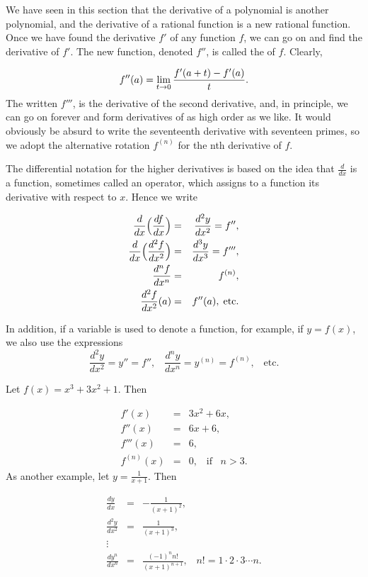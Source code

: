 We have seen in this section that the derivative of a polynomial is another polynomial, and the derivative of a rational function is a new rational function. Once we have found the derivative $f'$ of any function $f$, we can go on and find the derivative of $f'$. The new function, denoted $f''$, is called the  of $f$. Clearly,

$$
f''(a) = \lim_{t \rightarrow 0} {\frac{f' (a + t) - f'(a)}{t}} .
$$ 
The  written $f'''$, is the derivative of the second derivative, and, in principle, we can go on forever and form derivatives of as high order as we like. It would obviously be absurd to write the seventeenth derivative with seventeen primes, so we adopt the alternative rotation $f^{(n)}$ for the nth derivative of $f$.

The differential notation for the higher derivatives is based on the idea that  $\frac{d}{dx}$ is a function, sometimes called an operator, which assigns to a function its derivative with respect to $x$. Hence we write

\begin{eqnarray*}
\frac{d}{dx} \Bigl(\frac{df}{dx} \Bigr) &=& \frac{d^{2}y}{dx^2} = f'',\\
\frac{d}{dx} \Bigl( \frac{d^{2}f}{dx^2} \Bigr) &=& \frac{d^{3}y}{dx^3} = f''',\\
                              \frac{d^{n}f}{dx^n} &=& f^{(n)},\\
                           \frac{d^{2}f}{dx^2}(a) &=& f''(a), \; \mbox{etc.}
\end{eqnarray*}

In addition, if a variable is used to denote a function, for example, if $y = f(x)$, we also use the expressions
$$
\frac{{d^2}y}{dx^2} = y'' = f'',  \;\;\;  \frac{{d^n}y}{dx^n}= y^(n) = f^(n), 
\;\;\; \mbox{etc.}
$$

\begin{example} Let $f(x) = x^3 + 3x^2 + 1$. Then 

\begin{eqnarray*}
      f'(x) &=& 3x^2 + 6x, \\
      f''(x) &=& 6x + 6, \\
     f'''(x) &=& 6,\\
f^{(n)}(x)&=& 0, \;\;\; \mbox{if}\;\;\;   n>3.
\end{eqnarray*}
As another example, let $y = \frac{1}{x+ 1}$. Then

\begin{eqnarray*}
       \frac{dy}{dx} &=& -\frac{1}{(x + 1)^2},\\
\frac{d^2y}{dx^2} &=& \frac{1}{(x+1)^3}, \\
\vdots\\
\frac{dy^n}{dx^n} &=& \frac{(-1)^n n!}{(x+1)^{n+1}},  \;\;\; n!= 1 \cdot 2 \cdot 3 \cdots
n.
\end{eqnarray*}
\end{example}
